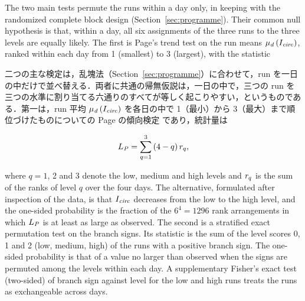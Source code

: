 \begin{en}[M6-4]
The two main tests permute the runs within a day only, in keeping with the randomized complete block design (Section~\ref{sec:programme}). Their common null hypothesis is that, within a day, all six assignments of the three runs to the three levels are equally likely. The first is Page's trend test  on the run means $\mu_{\mathit{d}}\left(I_{\mathit{circ}}\right)$, ranked within each day from 1 (smallest) to 3 (largest), with the statistic
\end{en}
\begin{ja}
二つの主な検定は，乱塊法（Section~\ref{sec:programme}）に合わせて，run を一日の中だけで並べ替える．両者に共通の帰無仮説は，一日の中で，三つの run を三つの水準に割り当てる六通りのすべてが等しく起こりやすい，というものである．第一は，run 平均 $\mu_{\mathit{d}}\left(I_{\mathit{circ}}\right)$ を各日の中で 1（最小）から 3（最大）まで順位づけたものについての Page の傾向検定  であり，統計量は
\end{ja}
\begin{equation}
L_{\mathit{P}} = \sum_{q=1}^{3} \left( 4 - q \right) r_{q} ,
\label{eq:Lpage}
\end{equation}
\begin{en}
where $q = 1$, 2 and 3 denote the low, medium and high levels and $r_{q}$ is the sum of the ranks of level $q$ over the four days. The alternative, formulated after inspection of the data, is that $I_{\mathit{circ}}$ decreases from the low to the high level, and the one-sided probability is the fraction of the $6^{4} = 1296$ rank arrangements in which $L_{\mathit{P}}$ is at least as large as observed. The second is a stratified exact permutation test on the branch signs. Its statistic is the sum of the level scores 0, 1 and 2 (low, medium, high) of the runs with a positive branch sign. The one-sided probability is that of a value no larger than observed when the signs are permuted among the levels within each day. A supplementary Fisher's exact test (two-sided) of branch sign against level for the low and high runs treats the runs as exchangeable across days.
\end{en}
